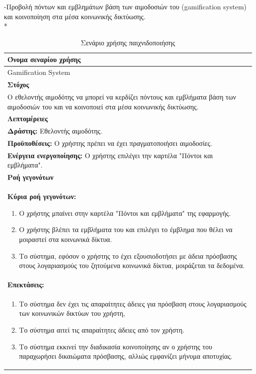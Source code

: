 \newpage
-Προβολή πόντων και εμβλημάτων βάση των αιμοδοσιών του (gamification system) και κοινοποίηση στα μέσα κοινωνικής δικτύωσης.
\\*
\begin{table}[H]
	\begin{center}
	    \begin{tabular}{|p{\dimexpr \linewidth-2\tabcolsep}|}
	    \hline
	    \rowcolor{grayy}
	    \textbf{Όνομα σεναρίου χρήσης}
	    \\ \hline    
	     Gamification System
	     \\ \hline
	    \rowcolor{grayy}
	    \textbf{\textbf{Στόχος}}
	    \\ \hline
	 	 Ο εθελοντής αιμοδότης να μπορεί να κερδίζει πόντους και εμβλήματα βάση των αιμοδοσιών του και να κοινοποιεί στα μέσα κοινωνικής δικτύωσης.
	    \\ \hline
	    \rowcolor{grayy}
	    \textbf{Λεπτομέρειες}
	    \\ \hline
		\textbf{Δράστης:} Εθελοντής αιμοδότης.
		\\*
		\textbf{Προϋποθέσεις:} Ο χρήστης πρέπει να έχει πραγματοποιήσει αιμοδοσίες.
		\\*
		\textbf{Ενέργεια ενεργοποίησης:} Ο χρήστης επιλέγει την καρτέλα "Πόντοι και εμβλήματα".
		\\ \hline
		\rowcolor{grayy}    
	    \textbf{Ροή γεγονότων}
	    \\ \hline
		\textbf{Κύρια ροή γεγονότων:}
		\begin{enumerate}
		\item	 Ο χρήστης μπαίνει  στην καρτέλα "Πόντοι και εμβλήματα" της εφαρμογής.
		\item Ο χρήστης βλέπει τα εμβλήματα του και επιλέγει το έμβλημα που θέλει να μοιραστεί στα κοινωνικά δίκτυα.
		\item Το σύστημα, εφόσον ο χρήστης το έχει εξουσιοδοτήσει με άδεια πρόσβασης στους λογαριασμούς του ζητούμενα κοινωνικά δίκτυα, μοιράζεται τα δεδομένα.
		\end{enumerate}
		\\ \hline
		\rowcolor{grayy}
		\textbf{Επεκτάσεις:}
		   \\ \hline
		\begin{enumerate}
			\item Το σύστημα δεν έχει τις απαραίτητες άδειες για πρόσβαση στους λογαριασμούς των κοινωνικών δικτύων του χρήστη,
			\item Το σύστημα αιτεί τις απαραίτητες άδειες από τον χρήστη.
			\item Το σύστημα εκκινεί την διαδικασία κοινοποίησης αν ο χρήστης του παραχωρήσει δικαιώματα πρόσβασης, αλλιώς εμφανίζει μήνυμα αποτυχίας.
		\end{enumerate}
		\\ \hline
	    \end{tabular}
	    \caption{Σενάριο χρήσης παιχνιδοποιήσης}
	    \label{tab:use_case_gamification} 
	\end{center}
\end{table}

